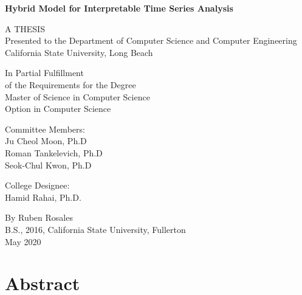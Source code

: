 \documentclass{turabian-thesis}
\begin{document}
\frontmatter
\thispagestyle{empty}

\begin{center}
   
   \textbf{Hybrid Model for Interpretable Time Series Analysis}
   
   \vspace*{\baselineskip} 
      
   A THESIS \\
   Presented to the Department of Computer Science and Computer Engineering \\
   California State University, Long Beach
   
   \vspace*{\baselineskip} 

   In Partial Fulfillment \\
   of the Requirements for the Degree \\
   Master of Science in Computer Science \\
   Option in Computer Science
   
   \vspace*{\baselineskip} 

   Committee Members: \\
   Ju Cheol Moon, Ph.D \\
   Roman Tankelevich, Ph.D \\
   Seok-Chul Kwon, Ph.D

   \vspace*{\baselineskip} 

   College Designee: \\
   Hamid Rahai, Ph.D.
   
   \vspace*{\baselineskip} 

   By Ruben Rosales \\
   B.S., 2016, California State University, Fullerton \\
   May 2020
\end{center}

\pagebreak

\chapter*{Abstract}

\end{document}
